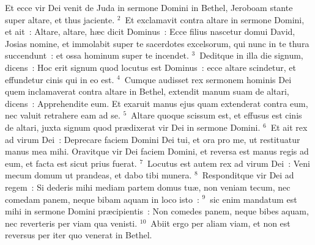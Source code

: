 \bchapter
\lettrine[lines=3,image=true,loversize=0.05,lraise=-0.03]{E}{}t ecce vir Dei venit de Juda in sermone Domini in Bethel, Jeroboam stante super altare, et thus jaciente.
${}^{2}$~Et exclamavit contra altare in sermone Domini, et ait~: Altare, altare, h\ae c dicit Dominus~: Ecce filius nascetur domui David, Josias nomine, et immolabit super te sacerdotes excelsorum, qui nunc in te thura succendunt~: et ossa hominum super te incendet.
${}^{3}$~Deditque in illa die signum, dicens~: Hoc erit signum quod locutus est Dominus~: ecce altare scindetur, et effundetur cinis qui in eo est.
${}^{4}$~Cumque audisset rex sermonem hominis Dei quem inclamaverat contra altare in Bethel, extendit manum suam de altari, dicens~: Apprehendite eum. Et exaruit manus ejus quam extenderat contra eum, nec valuit retrahere eam ad se.
${}^{5}$~Altare quoque scissum est, et effusus est cinis de altari, juxta signum quod pr\ae dixerat vir Dei in sermone Domini.
${}^{6}$~Et ait rex ad virum Dei~: Deprecare faciem Domini Dei tui, et ora pro me, ut restituatur manus mea mihi. Oravitque vir Dei faciem Domini, et reversa est manus regis ad eum, et facta est sicut prius fuerat.
${}^{7}$~Locutus est autem rex ad virum Dei~: Veni mecum domum ut prandeas, et dabo tibi munera.
${}^{8}$~Responditque vir Dei ad regem~: Si dederis mihi mediam partem domus tu\ae , non veniam tecum, nec comedam panem, neque bibam aquam in loco isto~:
${}^{9}$~sic enim mandatum est mihi in sermone Domini pr\ae cipientis~: Non comedes panem, neque bibes aquam, nec reverteris per viam qua venisti.
${}^{10}$~Abiit ergo per aliam viam, et non est reversus per iter quo venerat in Bethel.


